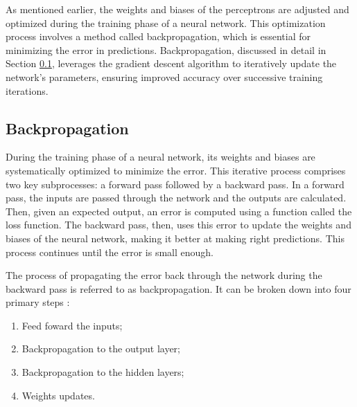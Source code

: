 As mentioned earlier, the weights and biases of the perceptrons are adjusted and optimized during the training phase of a neural network. This optimization process involves a method called backpropagation, which is essential for minimizing the error in predictions. Backpropagation, discussed in detail in Section \ref{sec-backpropagation}, leverages the gradient descent algorithm to iteratively update the network's parameters, ensuring improved accuracy over successive training iterations.

\subsection{Backpropagation} \label{sec-backpropagation}

During the training phase of a neural network, its weights and biases are systematically optimized to minimize the error. This iterative process comprises two key subprocesses: a forward pass followed by a backward pass. In a forward pass, the inputs are passed through the network and the outputs are calculated. Then, given an expected output, an error is computed using a function called the loss function. The backward pass, then, uses this error to update the weights and biases of the neural network, making it better at making right predictions. This process continues until the error is small enough.

The process of propagating the error back through the network during the backward pass is referred to as backpropagation. It can be broken down into four primary steps \cite{cilimkovic2015neural}:

\begin{enumerate}
    \item Feed foward the inputs;
    \item Backpropagation to the output layer;
    \item Backpropagation to the hidden layers;
    \item Weights updates.
\end{enumerate}

